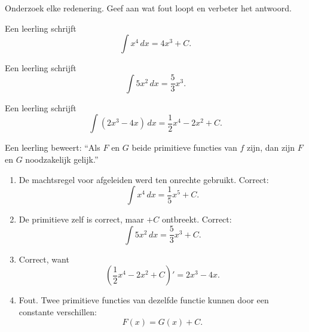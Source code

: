 \documentclass{ximera}
\begin{document}
\begin{oefening}{\oefU\ESS}

Onderzoek elke redenering. Geef aan wat fout loopt en verbeter het antwoord.

\begin{question}
Een leerling schrijft
\[
\int x^4\,dx=4x^3+C.
\]
\end{question}

\begin{question}
Een leerling schrijft
\[
\int 5x^2\,dx=\frac53x^3.
\]
\end{question}

\begin{question}
Een leerling schrijft
\[
\int (2x^3-4x)\,dx
=\frac12x^4-2x^2+C.
\]
\end{question}

\begin{question}
Een leerling beweert: ``Als $F$ en $G$ beide primitieve functies van $f$ zijn, dan zijn $F$ en $G$ noodzakelijk gelijk.''
\end{question}

\begin{oplossing}

\begin{enumerate}
\item De machtsregel voor afgeleiden werd ten onrechte gebruikt. Correct:
\[
\boxed{\int x^4\,dx=\frac15x^5+C}.
\]

\item De primitieve zelf is correct, maar $+C$ ontbreekt. Correct:
\[
\boxed{\int 5x^2\,dx=\frac53x^3+C}.
\]

\item Correct, want
\[
\left(\frac12x^4-2x^2+C\right)'=2x^3-4x.
\]

\item Fout. Twee primitieve functies van dezelfde functie kunnen door een constante verschillen:
\[
F(x)=G(x)+C.
\]
\end{enumerate}

\end{oplossing}

\end{oefening}


\end{document}
